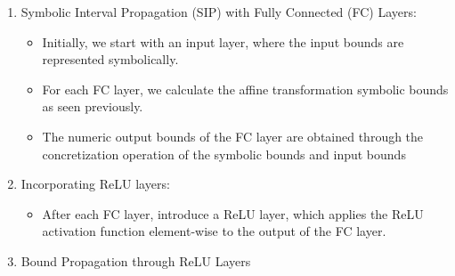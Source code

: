 \begin{enumerate}
	\item Symbolic Interval Propagation (SIP) with Fully Connected (FC) Layers:

	\begin{itemize}
		\item Initially, we start with an input layer, where the input bounds are represented symbolically.
		\item For each FC layer, we calculate the affine transformation symbolic bounds as seen previously.
		\item The numeric output bounds of the FC layer are obtained through the concretization operation of the symbolic bounds and input bounds
	\end{itemize}

	\item Incorporating ReLU layers:

		\begin{itemize}
			\item After each FC layer, introduce a ReLU layer, which applies the ReLU activation function element-wise to the output of the FC layer.
		\end{itemize}

	\item Bound Propagation through ReLU Layers


\end{enumerate}
